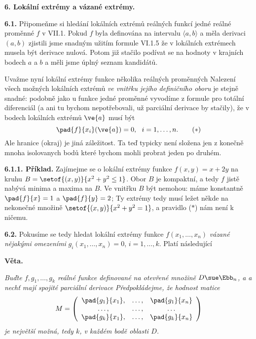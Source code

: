 \documentclass[12pt]{article}
\begin{document}
{\vskip10mm
 
  
 {\large\bf 6. Lokální extrémy a vázané extrémy.}
 
 \bigskip
 
{\bf 6.1.} Připomeňme si hledání lokálních extrémů reálných funkcí jedné reálné proměnné
  $f$ v VII.1. Pokud $f$ byla definována na intervalu $\langle a,b\rangle$ a měla derivaci  $(a,b)$ zjistili jsme snadným užitím formule  VI.1.5   že v lokálních extrémech musela být derivace nulová.
	Potom již stačilo  podívat se na hodnoty v krajních bodech $a$ a $b$ a měli jsme úplný seznam kandidátů.

Uvažme nyní lokální extrémy funkce několika reálných proměnných
Nalezení všech možných
lokálních extrémů {\em ve vnitřku jejího definičního oboru} je stejně snadné: podobně jako u funkce jedné proměnné vyvodíme z formule pro totální diferenciál  (a ani tu bychom nepotřebovali, už parciální derivace by stačily), že v bodech lokálních extrémů  $\ve{a}$ musí být
\begin{equation} 
\pad{f}{x_i}(\ve{a})=0,\ \ i=1,\dots,n.\tag{$*$}
\end{equation} 
Ale hranice (okraj) je jiná záležitost. Ta teď  typicky není složena jen z konečně mnoha isolovanych bodů
které bychom mohli probrat jeden po druhém. 


\smallskip

{\bf 6.1.1. Příklad.} Zajímejme se o lokální extr\'emy funkce
$f(x,y)=x+2y$ na kruhu $B=\setof{(x,y)}{x^2+y^2\leq 1}$. Obor $B$ je 
kompaktní, a tedy  $f$  jistě nabývá 
minima a maxima na $B$. Ve vnitřku $B$ být nemohou: máme konstantně
 $\pad{f}{x}=1$ a $\pad{f}{y}=2$; Ty extrémy tedy musí ležet někde na
nekonečné množině
$\setof{(x,y)}{x^2+y^2=1}$, a pravidlo ($*$) nám není k ničemu.



\bigskip


{\bf 6.2.} Pokusíme se tedy hledat
lokální extrémy funkce
 $f(x_1,\dots,x_n)$ {\em vázané nějakými omezeními}
$g_i(x_1,\dots,x_n)=0$, $i=1,\dots,k$.
 Platí následující
 
 \medskip
 
 {\bf Věta.} {\em Buďte $f,g_1,\dots,g_k$ reálné funkce definované na otevřené množině
$D\sue \Ebb_n$, a a nechť mají spojité parciální derivace 
 Předpokládejme, že hodnost matice
 $$
 M=\left(\begin{array}{ccc}
 \displaystyle\pad{g_1}{x_1},&\dots,&\displaystyle\pad{g_1}{x_n}\\
 \dots,&\dots,&\dots\\
 \displaystyle\pad{g_k}{x_1},&\dots,&\displaystyle\pad{g_k}{x_n}
 \end{array}\right)
 $$
 je největší možná, tedy
$k$, v každém bodě oblasti $D$. 

}}
\end{document}

